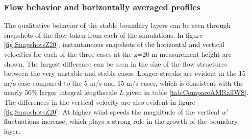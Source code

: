 \subsubsection{Flow behavior and horizontally averaged profiles}

The qualitative behavior of the stable boundary layers can be seen
through snapshots of the flow taken from each of the simulations.  In
figure \ref{fig:SnapshotsZ20}, instantaneous snapshots of the
horizontal and vertical velocities for each of the three cases at the
z=20 m measurement height are shown.  The largest difference can be
seen in the size of the flow structures between the very unstable and
stable cases.  Longer streaks are evident in the 15 m/s case compared
to the 5 m/s and 15 m/s cases, which is consistent with the nearly
50\% larger integral lengthscale $L$ given in table
\ref{tab:CompareAMRallWS}.  The differences in the vertical velocity
are also evident in figure \ref{fig:SnapshotsZ20}.  At higher wind speeds the
magnitude of the vertical $w'$ fluctuations increase, which plays a
strong role in the growth of the boundary layer.

